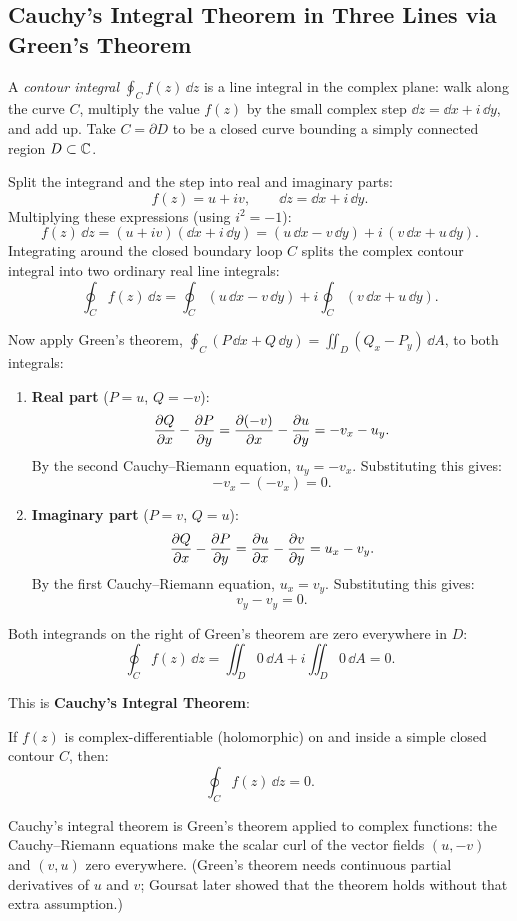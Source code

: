 \subsection{Cauchy's Integral Theorem in Three Lines via Green's Theorem}

A \emph{contour integral} $\oint_C f(z)\,\dd z$ is a line integral in the complex plane: walk along the curve $C$, multiply the value $f(z)$ by the small complex step $\dd z = \dd x + i\,\dd y$, and add up. Take $C = \partial D$ to be a closed curve bounding a simply connected region $D \subset \mathbb{C}$.

Split the integrand and the step into real and imaginary parts:
\[
f(z) = u + iv, \qquad \dd z = \dd x + i\,\dd y.
\]
Multiplying these expressions (using $i^2=-1$):
\[
f(z)\,\dd z = (u + iv)(\dd x + i\,\dd y) = (u\,\dd x - v\,\dd y) + i\,(v\,\dd x + u\,\dd y).
\]
Integrating around the closed boundary loop $C$ splits the complex contour integral into two ordinary real line integrals:
\begin{equation}
\oint_C f(z)\,\dd z = \oint_C (u\,\dd x - v\,\dd y) + i \oint_C (v\,\dd x + u\,\dd y).
\label{ch35:eq-contour-split}
\end{equation}

Now apply Green's theorem, $\oint_C (P\,\dd x + Q\,\dd y) = \iint_D (Q_x - P_y)\,\dd A$, to both integrals:
\begin{enumerate}
\item \textbf{Real part} ($P = u$, $Q = -v$):
\[
\frac{\partial Q}{\partial x} - \frac{\partial P}{\partial y} = \frac{\partial (-v)}{\partial x} - \frac{\partial u}{\partial y} = -v_x - u_y.
\]
By the second Cauchy--Riemann equation, $u_y = -v_x$. Substituting this gives:
\[
-v_x - (-v_x) = 0.
\]
\item \textbf{Imaginary part} ($P = v$, $Q = u$):
\[
\frac{\partial Q}{\partial x} - \frac{\partial P}{\partial y} = \frac{\partial u}{\partial x} - \frac{\partial v}{\partial y} = u_x - v_y.
\]
By the first Cauchy--Riemann equation, $u_x = v_y$. Substituting this gives:
\[
v_y - v_y = 0.
\]
\end{enumerate}

Both integrands on the right of Green's theorem are zero everywhere in $D$:
\begin{equation}
\oint_C f(z)\,\dd z = \iint_D 0\,\dd A + i \iint_D 0\,\dd A = 0.
\label{ch35:eq-cauchy-theorem}
\end{equation}

This is \textbf{Cauchy's Integral Theorem}:
\begin{theorem}
If $f(z)$ is complex-differentiable (holomorphic) on and inside a simple closed contour $C$, then:
\[
\oint_C f(z)\,\dd z = 0.
\]
\end{theorem}
Cauchy's integral theorem is Green's theorem applied to complex functions: the Cauchy--Riemann equations make the scalar curl of the vector fields $(u, -v)$ and $(v, u)$ zero everywhere. (Green's theorem needs continuous partial derivatives of $u$ and $v$; Goursat later showed that the theorem holds without that extra assumption.)

